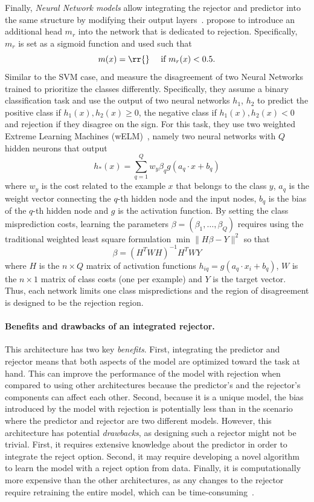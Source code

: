 Finally, \emph{Neural Network models}  allow integrating the rejector and predictor into the same structure by modifying their output layers~\citep{Gangrade2021,Ziyin2019}.  \citet{Geifman2019b} propose to introduce an additional head $m_r$ into the network that is dedicated to rejection. Specifically, $m_r$ is set as a sigmoid function and used such that 
\begin{equation*}
    m(x) = \rr{} \quad \text{ if } m_r(x) < 0.5.
\end{equation*}
Similar to the SVM case, \citet{GascaA.2011} and \citet{Mesquita2016} measure the disagreement of two Neural Networks trained to prioritize the classes differently. Specifically, they assume a binary classification task and use the output of two neural networks $h_1$, $h_2$ to predict the positive class if $h_1(x), h_2(x) \ge 0$, the negative class if $h_1(x), h_2(x) < 0$ and rejection if they disagree on the sign. For this task, they use two weighted Extreme Learning Machines (wELM)~\citep{Zong2013}, namely two neural networks with $Q$ hidden neurons that output 
$$h_*(x) = \sum_{q=1}^Q w_y \beta_q g(a_q \cdot x + b_q)$$
where $w_y$ is the cost related to the example $x$ that belongs to the class $y$, $a_q$ is the weight vector connecting the $q$-th hidden node and the input nodes, $b_q$ is the bias of the $q$-th hidden node and $g$ is the activation function. By setting the class misprediction costs, learning the parameters $\beta = (\beta_1,\dots,\beta_Q)$ requires using the traditional weighted least square formulation $\min \| H \beta - Y\|^2$ so that
\begin{equation*}
    \beta = (H^TWH)^{-1}H^TWY
\end{equation*}
where $H$ is the $n\times Q$ matrix of activation functions $h_{iq} = g(a_q \cdot x_i + b_q)$, $W$ is the $n\times 1$ matrix of class costs (one per example) and $Y$ is the target vector. Thus, each network limits one class mispredictions and the region of disagreement is designed to be the rejection region.

\paragraph{\bf{Benefits and drawbacks of an integrated rejector.}}
This architecture has two key \emph{benefits}.
First, integrating the predictor and rejector means that both aspects of the model are optimized toward the task at hand. 
This can improve the performance of the model with rejection when compared to using other architectures because the predictor's and the rejector's components can affect each other.
Second, because it is a unique model, the bias introduced by the model with rejection is potentially less than in the scenario where the predictor and rejector are two different models. 
However, this architecture has potential \emph{drawbacks}, as designing such a rejector might not be trivial. First, it requires extensive knowledge about the predictor in order to integrate the reject option. Second, it may require developing a novel algorithm to learn the model with a reject option from data. Finally, it is computationally more expensive than the other architectures, as any changes to the rejector require retraining the entire model, which can be time-consuming~\citep{Clertant2020,Shpakova2021}.
